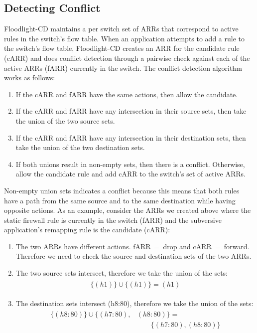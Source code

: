 \subsection{Detecting Conflict}
\label{subsec:conflict}
Floodlight-CD maintains a per switch set of ARRs that correspond to active rules in the switch's flow table.
When an application attempts to add a rule to the switch's flow table, Floodlight-CD creates an ARR for the candidate rule (cARR) and does conflict detection through a pairwise check against each of the active ARRs (fARR) currently in the switch. 
The conflict detection algorithm works as follows:
\begin{enumerate}
\item If the cARR and fARR have the same actions, then allow the candidate.
\item If the cARR and fARR have any intersection in their source sets, then take the union of the two source sets.
\item If the cARR and fARR have any intersection in their destination sets, then take the union of the two destination sets.
\item If both unions result in non-empty sets, then there is a conflict. Otherwise, allow the candidate rule and add cARR to the switch's set of active ARRs.
\end{enumerate} 

Non-empty union sets indicates a conflict because this means that both rules have a path from the same source and to the same destination while having opposite actions.
As an example, consider the ARRs we created above where the static firewall rule is currently in the switch (fARR) and the subversive application's remapping rule is the candidate (cARR):

\begin{enumerate}
\item The two ARRs have different actions. \mbox{fARR = drop} and \mbox{cARR = forward}. Therefore we need to check the source and destination sets of the two ARRs.
\item The two source sets intersect, therefore we take the union of the sets:
\begin{align}
\begin{aligned}
\{(h1)\} \cup \{(h1)\} = (h1) \nonumber
\end{aligned}
\end{align}
\item The destination sets intersect (h8:80), therefore we take the union of the sets:
\begin{align}
\begin{aligned}
\{(h8:80)\} \cup \{(h7:80),&(h8:80)\} = \\
        & \qquad \{(h7:80),(h8:80)\} \nonumber
\end{aligned}
\end{align}
\end{enumerate} 

